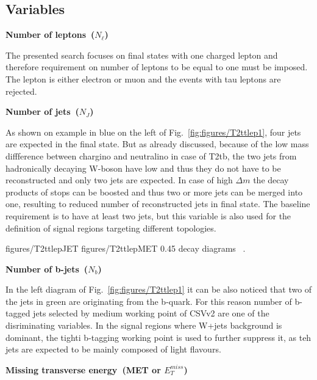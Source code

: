 
\subsection{Variables~\label{sec:variables}}

\textbf{Number of leptons~($N_{\ell}$)}

The presented search focuses on final states with one charged lepton and therefore requirement on number of leptons to be equal to one must be imposed. The lepton is either electron or muon and the events with tau leptons are rejected.

\textbf{Number of jets~($N_{J}$)}

As shown on example in blue on the left of Fig.~\ref{fig:figures/T2ttlep1}, four jets are expected in the final state. But as already discussed, because of the low mass diffference between chargino and neutralino in case of T2tb, the two jets from hadronically decaying W-boson have low \pt and thus they do not have to be reconstructed and only two jets are expected. In case of high $\Delta m$ the decay products of stops can be boosted and thus two or more jets can be merged into one, resulting to reduced number of reconstructed jets in final state. The baseline requirement is to have at least two jets, but this variable is also used for the definition of signal regions targeting different topologies.


                 {figures/T2ttlepJET} %
                 {figures/T2ttlepMET} %
                 {0.45}       %
                 { decay diagrams ~\cite{CMS:2016vew}. }

\textbf{Number of b-jets~($N_{b}$)}

In the left diagram of Fig.~\ref{fig:figures/T2ttlep1} it can be also noticed that two of the jets in green are originating from the b-quark. For this reason number of b-tagged jets selected by medium working point of CSVv2 are one of the disriminating variables. In the signal regions where W+jets background is dominant, the tighti b-tagging working point is used to further suppress it, as teh jets are expected to be mainly composed of light flavours.

\textbf{Missing transverse energy~(MET or $E_{T}^{miss}$)}

